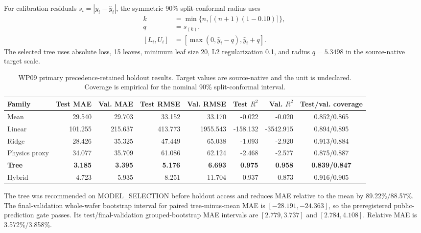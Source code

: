 \documentclass[10pt,twocolumn]{article}
\begin{document}
For calibration residuals $s_i=|y_i-\widehat y_i|$, the symmetric 90\%
split-conformal radius uses
\begin{equation}
 \begin{aligned}
 k &={} \min\{n,\lceil(n+1)(1-0.10)\rceil\},\\
 q &={} s_{(k)},\\
 [L_i,U_i] &={} [\max(0,\widehat y_i-q),\widehat y_i+q].
 \end{aligned}
 \label{eq:wp09-conformal}
\end{equation}
The selected tree uses absolute loss, 15 leaves, minimum leaf size 20, L2
regularization 0.1, and radius $q=5.3498$ in the source-native target scale.

\begin{table}[t]
\centering
\caption{WP09 primary precedence-retained holdout results. Target values are
source-native and the unit is undeclared. Coverage is empirical for the
nominal 90\% split-conformal interval.}
\label{tab:wp09-primary}
\scriptsize
\begin{tabular}{lrrrrrrc}
\toprule
Family & Test MAE & Val. MAE & Test RMSE & Val. RMSE & Test $R^2$ & Val. $R^2$ & Test/val. coverage\\
\midrule
Mean & 29.540 & 29.703 & 33.152 & 33.170 & -0.022 & -0.020 & 0.852/0.865\\
Linear & 101.255 & 215.637 & 413.773 & 1955.543 & -158.132 & -3542.915 & 0.894/0.895\\
Ridge & 28.426 & 35.325 & 47.449 & 65.038 & -1.093 & -2.920 & 0.913/0.884\\
Physics proxy & 34.077 & 35.709 & 61.086 & 62.124 & -2.468 & -2.577 & 0.875/0.887\\
\textbf{Tree} & \textbf{3.185} & \textbf{3.395} & \textbf{5.176} & \textbf{6.693} & \textbf{0.975} & \textbf{0.958} & \textbf{0.839/0.847}\\
Hybrid & 4.723 & 5.935 & 8.251 & 11.704 & 0.937 & 0.873 & 0.916/0.905\\
\bottomrule
\end{tabular}
\end{table}

The tree was recommended on MODEL\_SELECTION before holdout access and reduces
MAE relative to the mean by 89.22\%/88.57\%. The final-validation whole-wafer
bootstrap interval for paired tree-minus-mean MAE is
$[-28.191,-24.363]$, so the preregistered public-prediction gate passes. Its
test/final-validation grouped-bootstrap MAE intervals are
$[2.779,3.737]$ and $[2.784,4.108]$. Relative MAE is 3.572\%/3.858\%.
\end{document}
